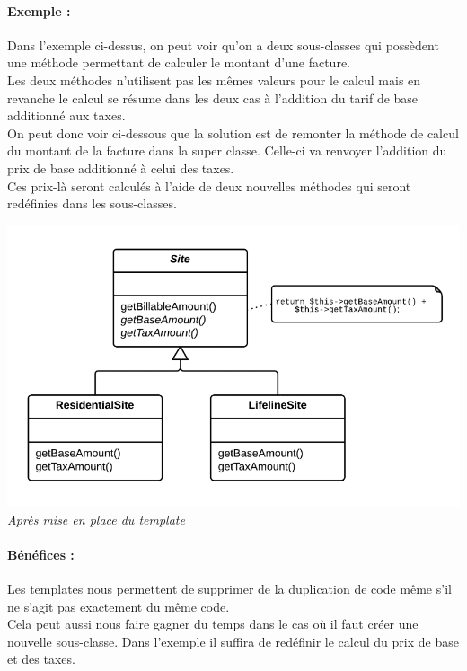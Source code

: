\documentclass[a4paper,twoside,12pt,openright]{report}
\begin{document}
\paragraph{Exemple :}
Dans l'exemple ci-dessus, on peut voir qu'on a deux sous-classes qui possèdent une méthode permettant de calculer le montant d'une facture.\\
Les deux méthodes n'utilisent pas les mêmes valeurs pour le calcul mais en revanche le calcul se résume dans les deux cas à l'addition du tarif de base additionné aux taxes.\\
On peut donc voir ci-dessous que la solution est de remonter la méthode de calcul du montant de la facture dans la super classe. Celle-ci va renvoyer l'addition du prix de base additionné à celui des taxes.\\
Ces prix-là seront calculés à l'aide de deux nouvelles méthodes qui seront redéfinies dans les sous-classes.\\

\begin{center}
\includegraphics[scale=0.75]{Image/Template2.png}\\
\itshape{Après mise en place du template \cite{ref5}}
\end{center}

\paragraph{Bénéfices :}
Les templates nous permettent de supprimer de la duplication de code même s'il ne s'agit pas exactement du même code.\\
Cela peut aussi nous faire gagner du temps dans le cas où il faut créer une nouvelle sous-classe. Dans l'exemple il suffira de redéfinir le calcul du prix de base et des taxes.\\
\end{document}
